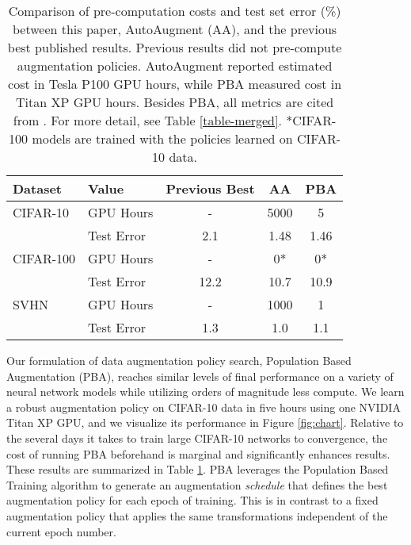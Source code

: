 \documentclass{article}
\begin{document}
\begin{table}[t]
\caption{Comparison of pre-computation costs and test set error (\%) between this paper, AutoAugment (AA), and the previous best published results. Previous results did not pre-compute augmentation policies. AutoAugment reported estimated cost in Tesla P100 GPU hours, while PBA measured cost in Titan XP GPU hours. Besides PBA, all metrics are cited from \cite{autoaug}. For more detail, see Table \ref{table-merged}. *CIFAR-100 models are trained with the policies learned on CIFAR-10 data.}
\label{table-runtime}
\vskip 0.15in
\begin{center}
\begin{small}
\begin{tabular}{llccc}
\toprule
Dataset & Value & Previous Best & AA & PBA  \\
\midrule
CIFAR-10 & GPU Hours & - & 5000 & 5 \\
 & Test Error & 2.1 & 1.48 & 1.46 \\
\midrule
CIFAR-100 & GPU Hours & - & 0* & 0* \\
 & Test Error & 12.2 & 10.7 & 10.9 \\
\midrule
SVHN & GPU Hours & - & 1000 & 1 \\
 & Test Error & 1.3 & 1.0 & 1.1 \\
\bottomrule
\end{tabular}
\end{small}
\end{center}
\end{table}
 
Our formulation of data augmentation policy search, Population Based Augmentation (PBA), reaches similar levels of final performance on a variety of neural network models while utilizing orders of magnitude less compute. We learn a robust augmentation policy on CIFAR-10 data in five hours using one NVIDIA Titan XP GPU, and we visualize its performance in Figure \ref{fig:chart}. Relative to the several days it takes to train large CIFAR-10 networks to convergence, the cost of running PBA beforehand is marginal and significantly enhances results. These results are summarized in Table \ref{table-runtime}. PBA leverages the Population Based Training algorithm \cite{pbt} to generate an augmentation \textit{schedule} that defines the best augmentation policy for each epoch of training. This is in contrast to a fixed augmentation policy that applies the same transformations independent of the current epoch number.
\end{document}
